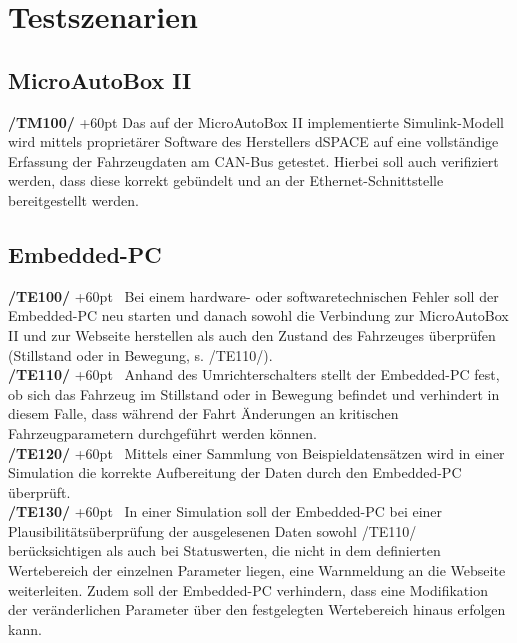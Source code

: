 \documentclass[fontsize = 12pt, paper = a4]{scrreprt}
\begin{document}
\vspace{\baselineskip}




\chapter{Testszenarien}

\section{\gls{MicroAutoBox II}}

\textbf{/TM100/} 
\hangindent+60pt 
Das auf der \gls{MicroAutoBox II} implementierte Simulink-Modell wird mittels proprietärer Software des Herstellers dSPACE auf eine vollständige Erfassung der Fahrzeugdaten am \gls{CAN-Bus} getestet. Hierbei soll auch verifiziert werden, dass diese korrekt gebündelt und an der \gls{Ethernet}-Schnittstelle bereitgestellt werden. 

\section{\gls{Embedded-PC}}

\textbf{/TE100/} 
\hangindent+60pt 
\ Bei einem hardware- oder softwaretechnischen Fehler soll der \gls{Embedded-PC} neu starten und danach sowohl die Verbindung zur \gls{MicroAutoBox II} und zur Webseite herstellen als auch den Zustand des Fahrzeuges überprüfen \\ (Stillstand oder in Bewegung, s. /TE110/). \\

\textbf{/TE110/} 
\hangindent+60pt 
\ Anhand des Umrichterschalters stellt der \gls{Embedded-PC} fest, ob sich das Fahrzeug im Stillstand oder in Bewegung befindet und verhindert in diesem Falle, dass während der Fahrt Änderungen an kritischen Fahrzeugparametern durchgeführt werden können. \\

\textbf{/TE120/} 
\hangindent+60pt 
\ Mittels einer Sammlung von Beispieldatensätzen wird in einer Simulation die korrekte Aufbereitung der Daten durch den \gls{Embedded-PC} überprüft. \\  

\textbf{/TE130/} 
\hangindent+60pt 
\ In einer Simulation soll der \gls{Embedded-PC} bei einer Plausibilitätsüberprüfung der ausgelesenen Daten  sowohl /TE110/ berücksichtigen als auch bei Statuswerten, die nicht in dem definierten Wertebereich der einzelnen Parameter liegen, eine Warnmeldung an die Webseite weiterleiten. Zudem soll der \gls{Embedded-PC} verhindern, dass eine Modifikation der veränderlichen Parameter über den festgelegten Wertebereich hinaus erfolgen kann. \\
\end{document}
